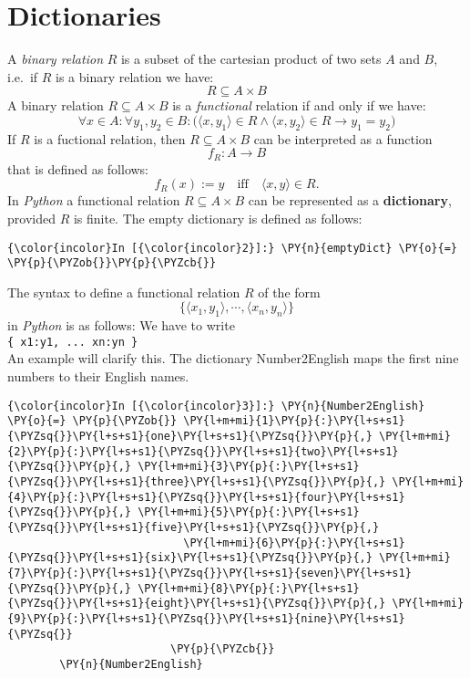 \section{Dictionaries}\label{dictionaries}
    A \emph{binary relation} \(R\) is a subset of the cartesian product of
two sets \(A\) and \(B\), i.e.~if \(R\) is a binary relation we have:
\[ R \subseteq A \times B \] A binary relation
\(R \subseteq A \times B\) is a \emph{functional} relation 
if and only if we have: \[ \forall x \in A: \forall y_1, y_2 \in B: \bigl(
     \langle x, y_1\rangle \in R \wedge \langle x, y_2\rangle \in R
     \rightarrow y_1 = y_2
   \bigr)
 \]
 If \(R\) is a fuctional relation, then \(R \subseteq A \times B\) can
be interpreted as a function \[ f_R:A \rightarrow B \] that is defined
as follows:
\[ f_R(x) := y \quad\mbox{iff}\quad \langle x, y\rangle \in R. \]
In \emph{Python} a functional relation \(R \subseteq A \times B\) can be
represented as a \textbf{dictionary}, provided \(R\) is finite. The
empty dictionary is defined as follows:
\begin{Verbatim}[commandchars=\\\{\}]
{\color{incolor}In [{\color{incolor}2}]:} \PY{n}{emptyDict} \PY{o}{=} \PY{p}{\PYZob{}}\PY{p}{\PYZcb{}}
\end{Verbatim}
The syntax to define a functional relation \(R\) of the form
\[ \bigl\{ \langle x_1, y_1\rangle, \cdots, \langle x_n, y_n\rangle \bigr\} \]
in \textsl{Python} is as follows: We have to write
\\[0.2cm]
\hspace*{1.3cm}
\texttt{\{ x1:y1, ... xn:yn \}}
\\[0.2cm]
An example will clarify this. The dictionary Number2English maps the first nine
numbers to their English names.

\begin{Verbatim}[commandchars=\\\{\}]
{\color{incolor}In [{\color{incolor}3}]:} \PY{n}{Number2English} \PY{o}{=} \PY{p}{\PYZob{}} \PY{l+m+mi}{1}\PY{p}{:}\PY{l+s+s1}{\PYZsq{}}\PY{l+s+s1}{one}\PY{l+s+s1}{\PYZsq{}}\PY{p}{,} \PY{l+m+mi}{2}\PY{p}{:}\PY{l+s+s1}{\PYZsq{}}\PY{l+s+s1}{two}\PY{l+s+s1}{\PYZsq{}}\PY{p}{,} \PY{l+m+mi}{3}\PY{p}{:}\PY{l+s+s1}{\PYZsq{}}\PY{l+s+s1}{three}\PY{l+s+s1}{\PYZsq{}}\PY{p}{,} \PY{l+m+mi}{4}\PY{p}{:}\PY{l+s+s1}{\PYZsq{}}\PY{l+s+s1}{four}\PY{l+s+s1}{\PYZsq{}}\PY{p}{,} \PY{l+m+mi}{5}\PY{p}{:}\PY{l+s+s1}{\PYZsq{}}\PY{l+s+s1}{five}\PY{l+s+s1}{\PYZsq{}}\PY{p}{,} 
                           \PY{l+m+mi}{6}\PY{p}{:}\PY{l+s+s1}{\PYZsq{}}\PY{l+s+s1}{six}\PY{l+s+s1}{\PYZsq{}}\PY{p}{,} \PY{l+m+mi}{7}\PY{p}{:}\PY{l+s+s1}{\PYZsq{}}\PY{l+s+s1}{seven}\PY{l+s+s1}{\PYZsq{}}\PY{p}{,} \PY{l+m+mi}{8}\PY{p}{:}\PY{l+s+s1}{\PYZsq{}}\PY{l+s+s1}{eight}\PY{l+s+s1}{\PYZsq{}}\PY{p}{,} \PY{l+m+mi}{9}\PY{p}{:}\PY{l+s+s1}{\PYZsq{}}\PY{l+s+s1}{nine}\PY{l+s+s1}{\PYZsq{}}
                         \PY{p}{\PYZcb{}}
        \PY{n}{Number2English}
\end{Verbatim}


